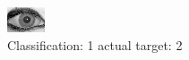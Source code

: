 \begin{figure}[h!]
\begin{center}
\includegraphics[width=0.60\columnwidth]{figures/ID2002_class_1_target_2.png}
\end{center}
\caption{ Classification: 1 actual target: 2}
\label{fig:ID2002_class_1_target_2}
\end{figure}
